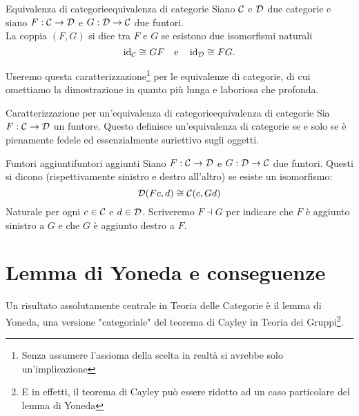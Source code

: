\documentclass{article}
\renewcommand\C{\mc{C}}
\newcommand\D{\mc{D}}
\begin{document}
\begin{definition}{Equivalenza di categorie}{equivalenza di categorie}
    Siano $\C$ e $\D$ due categorie e siano $F:\C\to\D$ e $G:\D\to\C$ due funtori.\\
    La coppia $(F,G)$ si dice  tra $F$ e $G$ se esistono due isomorfismi naturali
    \[ \id_\C \cong GF \quad\text{e}\quad \id_\D \cong FG .\]
\end{definition}

Useremo questa caratterizzazione\footnote{Senza assumere l'assioma della scelta in realtà si avrebbe solo un'implicazione} per le equivalenze di categorie, di cui omettiamo la dimostrazione in quanto più lunga e laboriosa che profonda.

\begin{proposition}{Caratterizzazione per un'equivalenza di categorie}{equivalenza di categorie}
    Sia $F : \C\to\D$ un funtore. Questo definisce un'equivalenza di categorie se e solo se è pienamente fedele ed essenzialmente suriettivo sugli oggetti.
\end{proposition}

\begin{definition}{Funtori aggiunti}{funtori aggiunti}
    Siano $F:\C\to\D$ e $G:\D\to\C$ due funtori. Questi si dicono  (rispettivamente sinistro e destro all'altro) se esiste un isomorfismo:
    \[ \D(Fc, d) \cong \C(c, Gd)\]
    Naturale per ogni $c \in \C$ e $d \in \D$. Scriveremo $F\dashv G$ per indicare che $F$ è aggiunto sinistro a $G$ e che $G$ è aggiunto destro a $F$.
\end{definition}

\section{Lemma di Yoneda e conseguenze}

Un risultato assolutamente centrale in Teoria delle Categorie è il lemma di Yoneda, una versione "categoriale" del teorema di Cayley in Teoria dei Gruppi\footnote{E in effetti, il teorema di Cayley può essere ridotto ad un caso particolare del lemma di Yoneda}.
\end{document}
